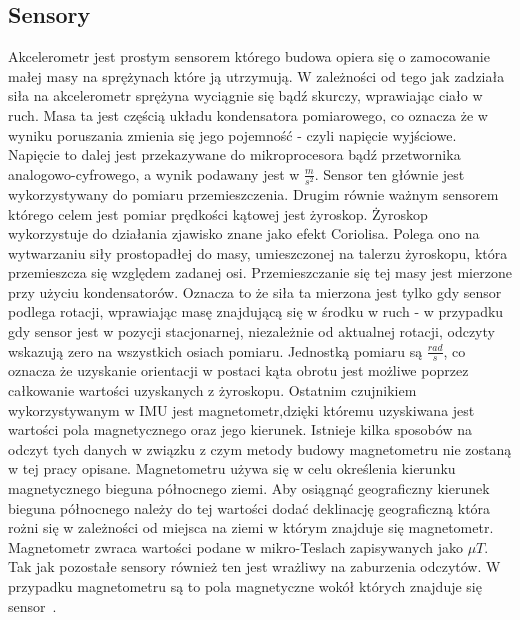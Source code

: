 		\subsection{Sensory}
		\label{subsec:sensory}
		Akcelerometr jest prostym sensorem którego budowa opiera się o zamocowanie małej masy na sprężynach które ją utrzymują. W zależności od tego jak zadziała siła na akcelerometr sprężyna wyciągnie się bądź skurczy, wprawiając ciało w ruch. Masa ta jest częścią układu kondensatora pomiarowego, co oznacza że w wyniku poruszania zmienia się jego pojemność - czyli napięcie wyjściowe. Napięcie to dalej jest przekazywane do mikroprocesora bądź przetwornika analogowo-cyfrowego, a wynik podawany jest w {\Large$\frac{m}{s^2}$}. Sensor ten głównie jest wykorzystywany do pomiaru przemieszczenia. Drugim równie ważnym sensorem którego celem jest pomiar prędkości kątowej jest żyroskop. Żyroskop wykorzystuje do działania zjawisko znane jako efekt Coriolisa. Polega ono na wytwarzaniu siły prostopadłej do masy, umieszczonej na talerzu żyroskopu, która przemieszcza się względem zadanej osi. Przemieszczanie się tej masy jest mierzone przy użyciu kondensatorów. Oznacza to że siła ta mierzona jest tylko gdy sensor podlega rotacji, wprawiając masę znajdującą się w środku w ruch - w przypadku gdy sensor jest w pozycji stacjonarnej, niezależnie od aktualnej rotacji, odczyty wskazują zero na wszystkich osiach pomiaru. Jednostką pomiaru są {\Large $\frac{rad}{s}$}, co oznacza że uzyskanie orientacji w postaci kąta obrotu jest możliwe poprzez całkowanie wartości uzyskanych z żyroskopu. Ostatnim czujnikiem wykorzystywanym w IMU jest magnetometr,dzięki któremu uzyskiwana jest wartości pola magnetycznego oraz jego kierunek. Istnieje kilka sposobów na odczyt tych danych w związku z czym metody budowy magnetometru nie zostaną w tej pracy opisane. Magnetometru używa się w celu określenia kierunku magnetycznego bieguna północnego ziemi. Aby osiągnąć geograficzny kierunek bieguna północnego należy do tej wartości dodać deklinację geograficzną która rożni się w zależności od miejsca na ziemi w którym znajduje się magnetometr. Magnetometr zwraca wartości podane w mikro-Teslach zapisywanych jako $\mu T$. Tak jak pozostałe sensory również ten jest wrażliwy na zaburzenia odczytów. W przypadku magnetometru są to pola magnetyczne wokół których znajduje się sensor~\cite{bSensory}.
